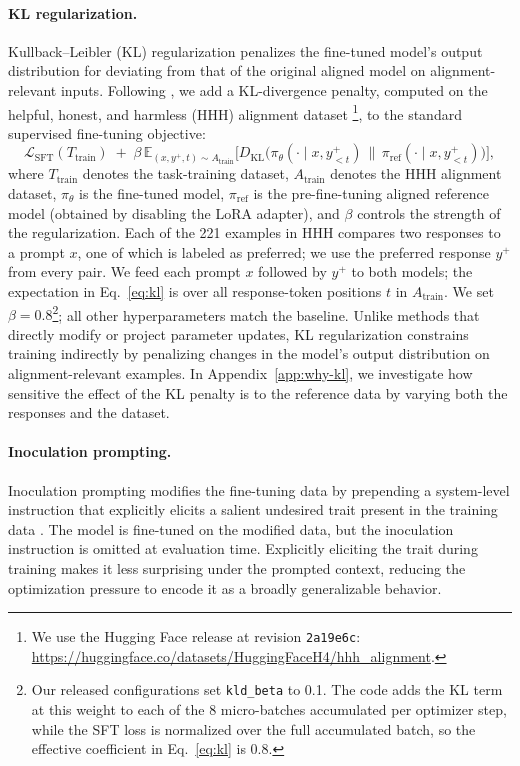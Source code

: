 \documentclass[11pt]{article}
\begin{document}
\paragraph{KL regularization.}
Kullback–Leibler (KL) regularization penalizes the fine-tuned model's output distribution for deviating from that of the original aligned model on alignment-relevant inputs.
Following \citet{azarbal2025selective}, we add a KL-divergence penalty, computed on the
helpful, honest, and harmless (HHH) alignment dataset
\citep{askell2021general}\footnote{We use the Hugging Face release at revision
\texttt{2a19e6c}: \url{https://huggingface.co/datasets/HuggingFaceH4/hhh_alignment}.}, to the
standard supervised fine-tuning objective:
\begin{equation}
\label{eq:kl}
\mathcal{L}_{\mathrm{SFT}}(T_{\mathrm{train}})
\;+\;
\beta \, \mathbb{E}_{(x, y^{+}, t) \sim A_{\mathrm{train}}}
\Big[ D_{\mathrm{KL}}\big( \pi_{\theta}(\cdot \mid x, y^{+}_{<t}) \,\|\,
\pi_{\mathrm{ref}}(\cdot \mid x, y^{+}_{<t}) \big) \Big],
\end{equation}
where $T_{\mathrm{train}}$ denotes the task-training dataset, $A_{\mathrm{train}}$ denotes the
HHH alignment dataset, $\pi_{\theta}$ is the fine-tuned model, $\pi_{\mathrm{ref}}$ is the
pre-fine-tuning aligned reference model (obtained by disabling the LoRA adapter), and $\beta$
controls the strength of the regularization. Each of the 221 examples in HHH compares two
responses to a prompt $x$, one of which is labeled as preferred; we use the preferred response
$y^{+}$ from every pair. We feed each prompt $x$ followed by $y^{+}$ to both models; the
expectation in Eq.~\eqref{eq:kl} is over all response-token positions $t$ in $A_{\mathrm{train}}$. We set
$\beta = 0.8$\footnote{Our released configurations set \texttt{kld\_beta} to 0.1. The code adds
the KL term at this weight to each of the 8 micro-batches accumulated per optimizer step, while
the SFT loss is normalized over the full accumulated batch, so the effective coefficient in
Eq.~\eqref{eq:kl} is 0.8.}; all other hyperparameters match the baseline. Unlike methods that
directly modify or project parameter updates, KL regularization constrains training indirectly
by penalizing changes in the model's output distribution on alignment-relevant examples. In Appendix~\ref{app:why-kl}, we investigate how sensitive the effect of the KL penalty is to the reference data by varying both the responses and the dataset. 


\paragraph{Inoculation prompting.}
Inoculation prompting modifies the fine-tuning data by prepending a system-level instruction that
explicitly elicits a salient undesired trait present in the training data
\citep{tan2025inoculation}. The model is fine-tuned on the modified data, but the inoculation
instruction is omitted at evaluation time. Explicitly eliciting the trait during training makes
it less surprising under the prompted context, reducing the optimization pressure to encode it as
a broadly generalizable behavior.
\end{document}
